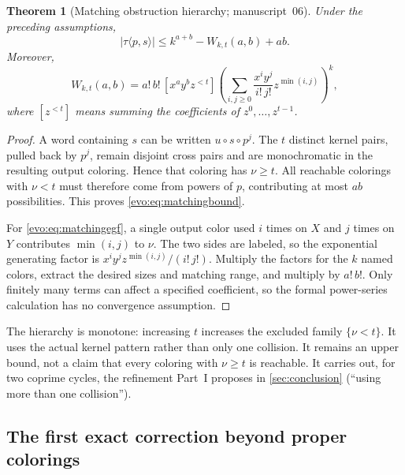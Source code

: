 \documentclass[11pt,a4paper]{article}
\numberwithin{equation}{section}
\newtheorem{theorem}{Theorem}[section]
\theoremstyle{definition}
\theoremstyle{remark}
\begin{document}
\begin{theorem}[Matching obstruction hierarchy; manuscript~06]\label{evo:thm:matching}
Under the preceding assumptions,
\begin{equation}\label{evo:eq:matchingbound}
 |\tau\langle p,s\rangle|\le k^{a+b}-W_{k,t}(a,b)+ab.
\end{equation}
Moreover,
\begin{equation}\label{evo:eq:matchingegf}
 W_{k,t}(a,b)=a!\,b!\,[x^ay^bz^{<t}]
 \left(\sum_{i,j\ge0}\frac{x^iy^j}{i!\,j!}z^{\min(i,j)}\right)^k,
\end{equation}
where $[z^{<t}]$ means summing the coefficients of $z^0,\ldots,z^{t-1}$.
\end{theorem}
\begin{proof}
A word containing $s$ can be written $u\circ s\circ p^j$. The $t$ distinct
kernel pairs, pulled back by $p^j$, remain disjoint cross pairs and are
monochromatic in the resulting output coloring. Hence that coloring has
$\nu\ge t$. All reachable colorings with $\nu<t$ must therefore come from
powers of $p$, contributing at most $ab$ possibilities. This proves
\eqref{evo:eq:matchingbound}.

For \eqref{evo:eq:matchingegf}, a single output color used $i$ times on $X$
and $j$ times on $Y$ contributes $\min(i,j)$ to $\nu$. The two sides are
labeled, so the exponential generating factor is
$x^iy^jz^{\min(i,j)}/(i!\,j!)$. Multiply the factors for the $k$ named colors,
extract the desired sizes and matching range, and multiply by $a!\,b!$. Only
finitely many terms can affect a specified coefficient, so the formal
power-series calculation has no convergence assumption.
\end{proof}

The hierarchy is monotone: increasing $t$ increases the excluded family
$\{\nu<t\}$. It uses the actual kernel pattern rather than only one collision.
It remains an upper bound, not a claim that every coloring with $\nu\ge t$ is
reachable. It carries out, for two coprime cycles, the refinement Part~I
proposes in \cref{sec:conclusion} (``using more than one collision'').

\subsection{The first exact correction beyond proper colorings}
\end{document}
